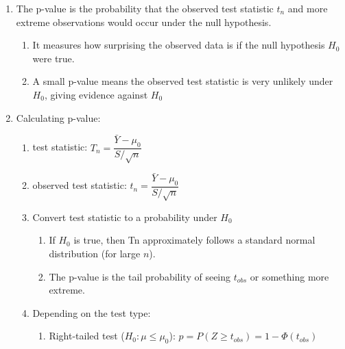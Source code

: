 \begin{enumerate}

    \item The p-value is the probability that the observed test statistic $t_n$ and more extreme observations would occur under the null hypothesis.
    \hfill \cite{statistics/book/Statistics-for-Data-Scientists/Maurits-Kaptein}
    \begin{enumerate}
        \item It measures how surprising the observed data is if the null hypothesis $H_0$ were true.
        \hfill \cite{common/online/chatgpt}

        \item A small p-value means the observed test statistic is very unlikely under $H_0 $, giving evidence against $H_0$
        \hfill \cite{common/online/chatgpt}
    \end{enumerate}

    \item Calculating p-value:
    \begin{enumerate}
        \item test statistic: $T_n = \dfrac{\bar{Y} - \mu_0}{S / \sqrt{n}}$
        \hfill \cite{common/online/chatgpt}

        \item observed test statistic: $t_n = \dfrac{\bar{Y} - \mu_0}{S / \sqrt{n}}$
        \hfill \cite{common/online/chatgpt}

        \item Convert test statistic to a probability under $H_0$
        \hfill \cite{common/online/chatgpt}
        \begin{enumerate}
            \item If $H_0$ is true, then Tn approximately follows a standard normal distribution (for large $n$).
            \hfill \cite{common/online/chatgpt}

            \item The p-value is the tail probability of seeing $t_{obs}$ or something more extreme.
            \hfill \cite{common/online/chatgpt}
        \end{enumerate}

        \item Depending on the test type:
        \hfill \cite{common/online/chatgpt}
        \begin{enumerate}
            \item Right-tailed test ($H_0:\mu\leq\mu_0$): $p=P(Z\geq t_{obs})=1-\Phi(t_{obs})$
            \hfill \cite{common/online/chatgpt}


\end{enumerate}
\end{enumerate}
\end{enumerate}
